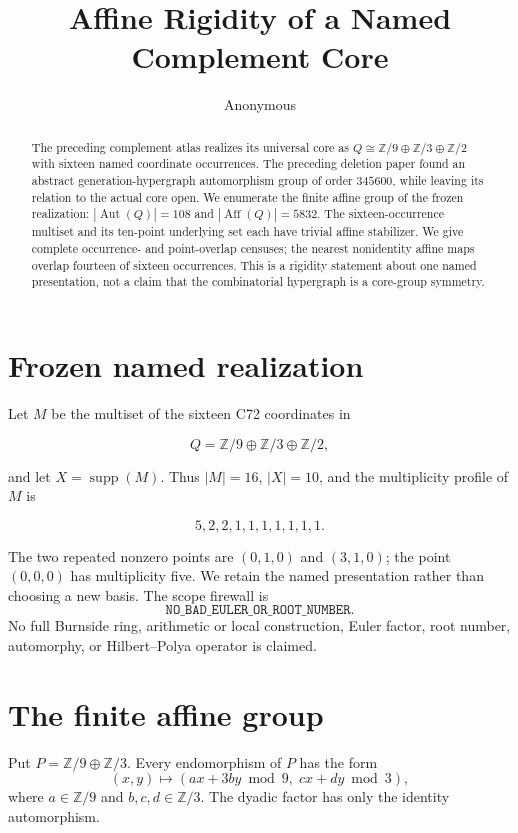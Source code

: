 \documentclass[10pt]{article}
\title{Affine Rigidity of a Named Complement Core}
\author{Anonymous}
\date{}
\newcommand{\Z}{\mathbb Z}
\begin{document}
\maketitle

\begin{abstract}
The preceding complement atlas realizes its universal core as
$Q\cong\Z/9\oplus\Z/3\oplus\Z/2$ with sixteen named coordinate occurrences.
The preceding deletion paper found an abstract generation-hypergraph
automorphism group of order $345600$, while leaving its relation to the actual
core open.  We enumerate the finite affine group of the frozen realization:
$|\operatorname{Aut}(Q)|=108$ and $|\operatorname{Aff}(Q)|=5832$.  The
sixteen-occurrence multiset and its ten-point underlying set each have trivial
affine stabilizer.  We give complete occurrence- and point-overlap censuses;
the nearest nonidentity affine maps overlap fourteen of sixteen occurrences.
This is a rigidity statement about one named presentation, not a claim that
the combinatorial hypergraph is a core-group symmetry.
\end{abstract}

\section{Frozen named realization}
Let $M$ be the multiset of the sixteen C72 coordinates in

\[
 Q=\Z/9\oplus\Z/3\oplus\Z/2,
\]

and let $X=\operatorname{supp}(M)$.  Thus $|M|=16$, $|X|=10$, and the
multiplicity profile of $M$ is

\[
 5,2,2,1,1,1,1,1,1,1.
\]

The two repeated nonzero points are $(0,1,0)$ and $(3,1,0)$; the point
$(0,0,0)$ has multiplicity five.  We retain the named presentation rather
than choosing a new basis.  The scope firewall is
\[
\texttt{NO\_BAD\_EULER\_OR\_ROOT\_NUMBER}.
\]
No full Burnside ring, arithmetic or local construction, Euler factor, root
number, automorphy, or Hilbert--Polya operator is claimed.

\section{The finite affine group}
Put $P=\Z/9\oplus\Z/3$.  Every endomorphism of $P$ has the form
\begin{equation}\label{eq:matrix}
 (x,y)\longmapsto (ax+3by\bmod 9,\;cx+dy\bmod 3),
\end{equation}
where $a\in\Z/9$ and $b,c,d\in\Z/3$.  The dyadic factor has only the
identity automorphism.
\end{document}
